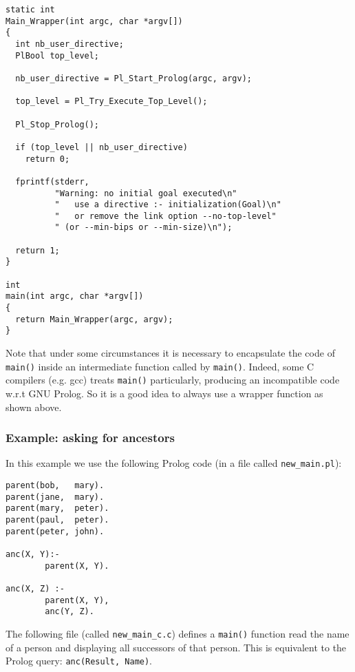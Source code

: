 \begin{Indentation}
\begin{verbatim}
static int
Main_Wrapper(int argc, char *argv[])
{
  int nb_user_directive;
  PlBool top_level;

  nb_user_directive = Pl_Start_Prolog(argc, argv);

  top_level = Pl_Try_Execute_Top_Level();

  Pl_Stop_Prolog();

  if (top_level || nb_user_directive)
    return 0;

  fprintf(stderr,
          "Warning: no initial goal executed\n"
          "   use a directive :- initialization(Goal)\n"
          "   or remove the link option --no-top-level"
          " (or --min-bips or --min-size)\n");

  return 1;
}

int
main(int argc, char *argv[])
{
  return Main_Wrapper(argc, argv);
}
\end{verbatim}
\end{Indentation}

Note that under some circumstances it is necessary to encapsulate the code of
\texttt{main()} inside an intermediate function called by
\texttt{main()}. Indeed, some C compilers (e.g. gcc) treats \texttt{main()}
particularly, producing an incompatible code w.r.t GNU Prolog. So it is a
good idea to always use a wrapper function as shown above.

\subsubsection{Example: asking for ancestors}

In this example we use the following Prolog code (in a file called
\texttt{new\_main.pl}):

\begin{Indentation}
\begin{verbatim}
parent(bob,   mary).
parent(jane,  mary).
parent(mary,  peter).
parent(paul,  peter).
parent(peter, john).

anc(X, Y):-
        parent(X, Y).

anc(X, Z) :-
        parent(X, Y),
        anc(Y, Z).
\end{verbatim}
\end{Indentation}

The following file (called \texttt{new\_main\_c.c}) defines a \texttt{main()}
function read the name of a person and displaying all successors of that
person. This is equivalent to the Prolog query: \texttt{anc(Result, Name)}.

